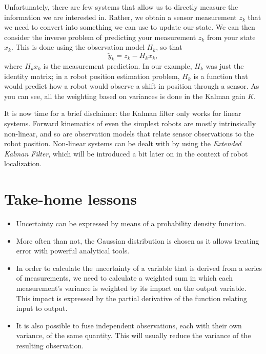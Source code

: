 Unfortunately, there are few systems that allow us to directly measure the information we are interested in. Rather, we obtain a sensor measurement $ z_k$ that we need to convert into something we can use to update our state. We can then consider the inverse problem of predicting your measurement $ z_k$ from your state $ x_k$. This is done using the observation model $ H_k$, so that
\begin{equation}
\tilde{y}_{k}=z_k-H_k x_k ,
\end{equation}
where 
$H_kx_k$ is the measurement prediction.
In our example, $ H_k$ was just the identity matrix; in a robot position estimation problem, $ H_k$ is a function that would predict how a robot would observe a shift in position through a sensor. As you can see, all the weighting based on variances is done in the Kalman gain $ K$.


It is now time for a brief disclaimer: the Kalman filter only works for linear systems. Forward kinematics of even the simplest robots are mostly intrinsically non-linear, and so are observation models that relate sensor observations to the robot position. Non-linear systems can be dealt with by using the \textsl{Extended Kalman Filter}, which will be introduced a bit later on in the context of robot localization. %


\section{Take-home lessons}
\begin{itemize}
\item Uncertainty can be expressed by means of a probability density function.
\item More often than not, the Gaussian distribution is chosen as it allows treating error with powerful analytical tools.
\item In order to calculate the uncertainty of a variable that is derived from a series of measurements, we need to calculate a weighted sum in which each measurement's variance is weighted by its impact on the output variable. This impact is expressed by the partial derivative of the function relating input to output.
\item It is also possible to fuse independent observations, each with their own variance, of the same quantity. This will usually reduce the variance of the resulting observation. 
\end{itemize}

